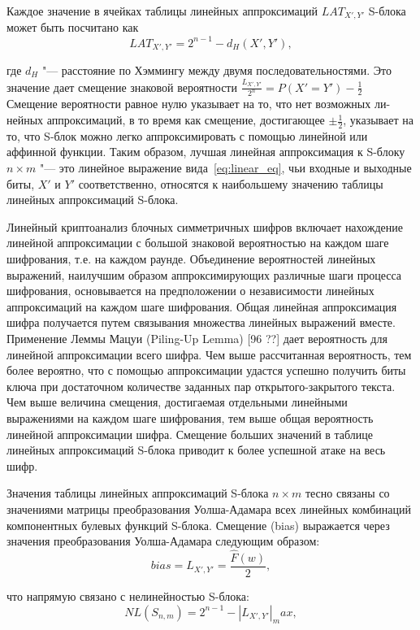 Каждое значение в ячейках таблицы линейных аппроксимаций $LAT_{X',Y'}$ S-блока
может быть посчитано как
\begin{equation}LAT_{X',Y'}=2^{n-1}-d_H(X', Y'),\end{equation} 

где $d_H$ "--- расстояние по Хэммингу между двумя последовательностями. Это
значение дает смещение знаковой вероятности $\frac{L_{X', Y'}}{2^n} = P(X' = Y')
-\frac{1}{2}$ Смещение вероятности равное нулю указывает на то, что нет
возможных ли- нейных аппроксимаций, в то время как смещение, достигающее $\pm
\frac{1}{2}$, указывает на то, что S-блок можно легко аппроксимировать с помощью
линейной или аффинной функции. Таким образом, лучшая линейная аппроксимация к
S-блоку $n \times m$ "--- это линейное выражение вида~\ref{eq:linear_eq}, чьи
входные и выходные биты, $X'$ и $Y'$ соответственно, относятся к наибольшему
значению таблицы линейных аппроксимаций S-блока.

Линейный криптоанализ блочных симметричных шифров включает нахождение линейной
аппроксимации с большой знаковой вероятностью на каждом шаге шифрования, т.е. на
каждом раунде. Объединение вероятностей линейных выражений, наилучшим образом
аппроксимирующих различные шаги процесса шифрования, основывается на
предположении о независимости линейных аппроксимаций на каждом шаге шифрования.
Общая линейная аппроксимация шифра получается путем связывания множества
линейных выражений вместе. Применение Леммы Мацуи (Piling-Up Lemma) [96 ??] дает
вероятность для линейной аппроксимации всего шифра. Чем выше рассчитанная
вероятность, тем более вероятно, что с помощью аппроксимации удастся успешно
получить биты ключа при достаточном количестве заданных пар открытого-закрытого
текста. Чем выше величина смещения, достигаемая отдельными линейными выражениями
на каждом шаге шифрования, тем выше общая вероятность линейной аппроксимации
шифра. Смещение больших значений в таблице линейных аппроксимаций S-блока
приводит к более успешной атаке на весь шифр.

Значения таблицы линейных аппроксимаций S-блока $n \times m$ тесно связаны со
значениями матрицы преобразования Уолша-Адамара всех линейных комбинаций
компонентных булевых функций S-блока. Смещение (bias) выражается через значения
преобразования Уолша-Адамара следующим образом:
\begin{equation}bias = L_{X', Y'} = \frac{\hat{F}(w)}{2},\end{equation}

что напрямую связано с нелинейностью S-блока:
\begin{equation}NL(S_{n,m}) = 2^{n-1} - |L_{X', Y'}|_max,\end{equation}

